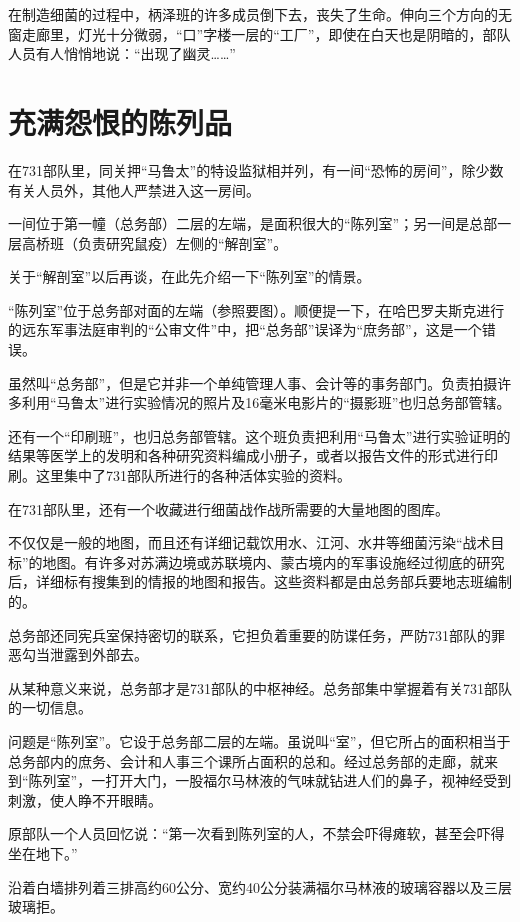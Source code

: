 \documentclass[a4paper,12pt,UTF8,twoside]{ctexbook}
\begin{document}
在制造细菌的过程中，柄泽班的许多成员倒下去，丧失了生命。伸向三个方向的无窗走廊里，灯光十分微弱，“口”字楼一层的“工厂”，即使在白天也是阴暗的，部队人员有人悄悄地说：“出现了幽灵……”

\section{充满怨恨的陈列品}

在731部队里，同关押“马鲁太”的特设监狱相并列，有一间“恐怖的房间”，除少数有关人员外，其他人严禁进入这一房间。

一间位于第一幢（总务部）二层的左端，是面积很大的“陈列室”；另一间是总部一层高桥班（负责研究鼠疫）左侧的“解剖室”。

关于“解剖室”以后再谈，在此先介绍一下“陈列室”的情景。

“陈列室”位于总务部对面的左端（参照要图）。顺便提一下，在哈巴罗夫斯克进行的远东军事法庭审判的“公审文件”中，把“总务部”误译为“庶务部”，这是一个错误。

虽然叫“总务部”，但是它并非一个单纯管理人事、会计等的事务部门。负责拍摄许多利用“马鲁太”进行实验情况的照片及16毫米电影片的“摄影班”也归总务部管辖。

还有一个“印刷班”，也归总务部管辖。这个班负责把利用“马鲁太”进行实验证明的结果等医学上的发明和各种研究资料编成小册子，或者以报告文件的形式进行印刷。这里集中了731部队所进行的各种活体实验的资料。

在731部队里，还有一个收藏进行细菌战作战所需要的大量地图的图库。

不仅仅是一般的地图，而且还有详细记载饮用水、江河、水井等细菌污染“战术目标”的地图。有许多对苏满边境或苏联境内、蒙古境内的军事设施经过彻底的研究后，详细标有搜集到的情报的地图和报告。这些资料都是由总务部兵要地志班编制的。

总务部还同宪兵室保持密切的联系，它担负着重要的防谍任务，严防731部队的罪恶勾当泄露到外部去。

从某种意义来说，总务部才是731部队的中枢神经。总务部集中掌握着有关731部队的一切信息。

问题是“陈列室”。它设于总务部二层的左端。虽说叫“室”，但它所占的面积相当于总务部内的庶务、会计和人事三个课所占面积的总和。经过总务部的走廊，就来到“陈列室”，一打开大门，一股福尔马林液的气味就钻进人们的鼻子，视神经受到刺激，使人睁不开眼睛。

原部队一个人员回忆说：“第一次看到陈列室的人，不禁会吓得瘫软，甚至会吓得坐在地下。”

沿着白墙排列着三排高约60公分、宽约40公分装满福尔马林液的玻璃容器以及三层玻璃拒。
\end{document}
